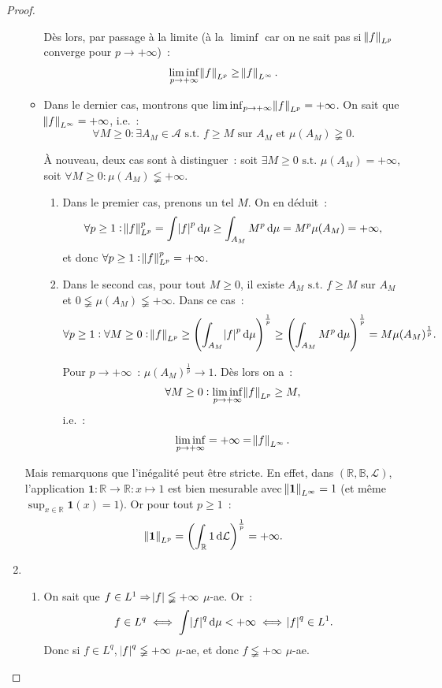\documentclass{article}
\newcommand{\pinfty}{{+\infty}}
\newcommand{\st}{\text{ s.t. }}
\newcommand{\R}{{\mathbb R}}
\newcommand{\B}{{\mathbb B}}
\begin{document}
\begin{proof}
\begin{enumerate}
\begin{itemize}
		Dès lors, par passage à la limite (à la $\liminf$ car on ne sait pas si $\norm f_{L^p}$ converge pour $p \to \pinfty$)~:
		\[\liminf_{p \to \pinfty} \norm f_{L^p} \geq \norm f_{L^\infty}.\]

		\item Dans le dernier cas, montrons que $\liminf_{p \to \pinfty}\norm f_{L^p} = \pinfty$. On sait que $\norm f_{L^\infty} = \pinfty$, i.e.~:
		\[\forall M \geq 0 : \exists A_M \in \mathcal A \st f \geq M \text{ sur } A_M \text{ et } \mu(A_M) \gneqq 0.\]

		À nouveau, deux cas sont à distinguer~: soit $\exists M \geq 0 \st \mu(A_M) = \pinfty$, soit $\forall M \geq 0 : \mu(A_M) \lneqq \pinfty$.
		\begin{enumerate}
			\item Dans le premier cas, prenons un tel $M$. On en déduit~:
			\[\forall p \geq 1 : \norm f_{L^p}^p = \int\abs f^p\dif\mu \geq \int_{A_M}M^p\dif\mu = M^p\mu(A_M) = \pinfty,\]
			et donc $\forall p \geq 1 : \norm f_{L^p}^p = \pinfty$.

			\item Dans le second cas, pour tout $M \geq 0$, il existe $A_M \st f \geq M$ sur $A_M$ et $0 \lneqq \mu(A_M) \lneqq \pinfty$. Dans ce cas~:
			\[\forall p \geq 1 : \forall M \geq 0 : \norm f_{L^p} \geq \left(\int_{A_M}\abs f^p\dif\mu\right)^{\frac 1p} \geq \left(\int_{A_M}M^p\dif\mu\right)^{\frac 1p}
			= M\mu(A_M)^{\frac 1p}.\]

			Pour $p \to \pinfty$~: $\mu(A_M)^{\frac 1p} \to 1$. Dès lors on a~:
			\[\forall M \geq 0 : \liminf_{p \to \pinfty} \norm f_{L^p} \geq M,\]
			i.e.~:
			\[\liminf_{p \to \pinfty} = \pinfty = \norm f_{L^\infty}.\]
		\end{enumerate}
	\end{itemize}

	Mais remarquons que l'inégalité peut être stricte. En effet, dans $(\R, \B, \mathcal L)$, l'application $\mathbf 1 : \R \to \R : x \mapsto 1$ est bien mesurable
	avec $\norm {\mathbf 1}_{L^\infty} = 1$ (et même $\sup_{x \in \R}\mathbf 1(x) = 1$). Or pour tout $p \geq 1$~:
	\[\norm {\mathbf 1}_{L^p} = \left(\int_\R 1\dif\mathcal L\right)^{\frac 1p} = \pinfty.\]

	{\small {}}

	\item~
	\begin{enumerate}
		\item On sait que $f \in L^1 \Rightarrow \abs f \lneqq \pinfty$ $\mu$-ae. Or~:
		\[f \in L^q \iff \int \abs f^q\dif\mu < \pinfty \iff \abs f^q \in L^1.\]
		Donc si $f \in L^q$, $\abs f^q \lneqq \pinfty$ $\mu$-ae, et donc $f \lneqq \pinfty$ $\mu$-ae.


\end{enumerate}
\end{enumerate}
\end{proof}
\end{document}

